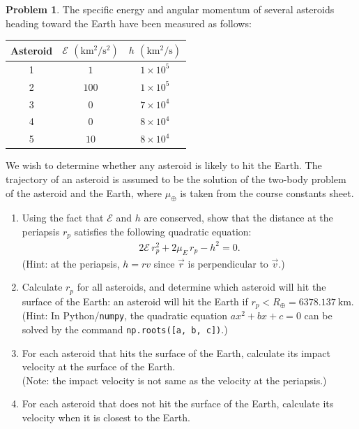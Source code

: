 \documentclass[10pt]{article}
\theoremstyle{definition}
\newtheorem{prob}{Problem}[section]
\newenvironment{subprob}%
{\renewcommand{\theenumi}{\alph{enumi}}\renewcommand{\labelenumi}{(\theenumi)}\begin{enumerate}}%
{\end{enumerate}}%
\begin{document}
\clearpage\newpage
\begin{prob}
The specific energy and angular momentum of several asteroids heading toward the Earth have been measured as follows:

\begin{center}
\begin{tabular}{c|c|c}\hline
Asteroid & $\mathcal{E}$ $(\mathrm{km^2/s^2})$ & $h$ $(\mathrm{km^2/s})$\\ \hline
1 & $1$ & $1\times 10^5$\\
2 & $100$ & $1\times 10^5$\\
3 & $0$ & $7\times 10^4$\\
4 & $0$ & $8\times 10^4$\\
5 & $10$ & $8\times 10^4$\\\hline
\end{tabular}
\end{center}
%
We wish to determine whether any asteroid is likely to hit the Earth. The trajectory of an asteroid is assumed to be the solution of the two-body problem of the asteroid and the Earth, where \( \mu_\oplus \) is taken from the course constants sheet.

\begin{subprob}
\item Using the fact that $\mathcal{E}$ and $h$ are conserved, show that the distance at the periapsis $r_p$ satisfies the following quadratic equation:
\begin{gather}
2\mathcal{E}\, r_p^2 + 2\mu_E\, r_p -h^2=0. 
\end{gather}
(Hint: at the periapsis, $h=rv$ since $\vec r$ is perpendicular to $\vec v$.)
\item Calculate $r_p$ for all asteroids, and determine which asteroid will hit the surface of the Earth: an asteroid will hit the Earth if $r_p < R_\oplus = \SI{6378.137}{\kilo\meter}$.\\
    (Hint: In Python/\texttt{numpy}, the quadratic equation $ax^2+bx+c=0$ can be solved by the command \texttt{np.roots([a, b, c])}.)
\item For each asteroid that hits the surface of the Earth, calculate its impact velocity at the surface of the Earth.\\
(Note: the impact velocity is not same as the velocity at the periapsis.)
\item For each asteroid that does not hit the surface of the Earth, calculate its velocity when it is closest to the Earth.
\end{subprob}
\end{prob}
\end{document}
